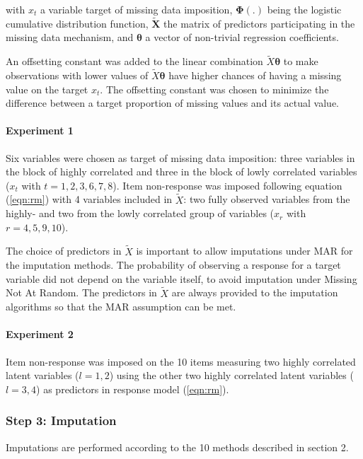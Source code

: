 	with $x_t$ a variable target of missing data imposition, $\bm{\Phi}(.)$ being the logistic cumulative
	distribution function, $\bm{\tilde{X}}$ the matrix of predictors participating in the missing data mechanism,
	and $\bm{\theta}$ a vector of non-trivial regression coefficients.
	
	An offsetting constant was added to the linear combination $\tilde{X}\bm{\theta}$ to make observations with 
	lower values of $\tilde{X}\bm{\theta}$ have higher chances of having a missing value on the target $x_t$. 
	The offsetting constant was chosen to minimize the difference between a target proportion of missing values 
	and its actual value.

	\paragraph{Experiment 1}
	Six variables were chosen as target of missing data imposition: three variables in the block of 
	highly correlated and three in the block of lowly correlated variables ($x_t$ with $t = 1,2,3,6,7,8$). 
	Item non-response was imposed following equation (\ref{eqn:rm}) with 4 variables included in $\tilde{X}$: two fully 
	observed variables from the highly- and two from the lowly correlated group of variables ($x_r$ with $r = 4,5,9,10$).

	The choice of predictors in $\tilde{X}$ is important to allow imputations under MAR for the imputation methods. 
	The probability of observing a response for a target variable did not depend on the variable itself, to avoid  
	imputation under Missing Not At Random.
	The predictors in $\tilde{X}$ are always provided to the imputation algorithms so that the MAR assumption can
	be met.

	\paragraph{Experiment 2}
	Item non-response was imposed on the 10 items measuring two highly correlated latent variables ($l = 1, 2$) 
	using the other two highly correlated latent variables ($l = 3, 4$) as predictors in response model (\ref{eqn:rm}). 

\subsubsection{Step 3: Imputation}
	
	Imputations are performed according to the 10 methods described in section 2.


